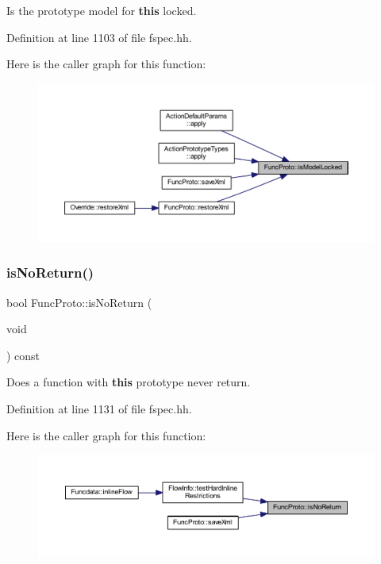 Is the prototype model for {\bfseries{this}} locked. 



Definition at line 1103 of file fspec.\+hh.

Here is the caller graph for this function\+:
\nopagebreak
\begin{figure}[H]
\begin{center}
\leavevmode
\includegraphics[width=350pt]{class_func_proto_a34162359ab3bd910a376bdad196f52e0_icgraph}
\end{center}
\end{figure}
\mbox{\label{class_func_proto_a2f1510914c66b2201248a6a06d282948}} 
\subsubsection{\texorpdfstring{isNoReturn()}{isNoReturn()}}
{\footnotesize\ttfamily bool Func\+Proto\+::is\+No\+Return (\begin{DoxyParamCaption}\item[{void}]{ }\end{DoxyParamCaption}) const\hspace{0.3cm}{\ttfamily [inline]}}



Does a function with {\bfseries{this}} prototype never return. 



Definition at line 1131 of file fspec.\+hh.

Here is the caller graph for this function\+:
\nopagebreak
\begin{figure}[H]
\begin{center}
\leavevmode
\includegraphics[width=350pt]{class_func_proto_a2f1510914c66b2201248a6a06d282948_icgraph}
\end{center}
\end{figure}
\mbox{\label{class_func_proto_aa8e57d21d21d08253f67cb201e83c5e4}} 
